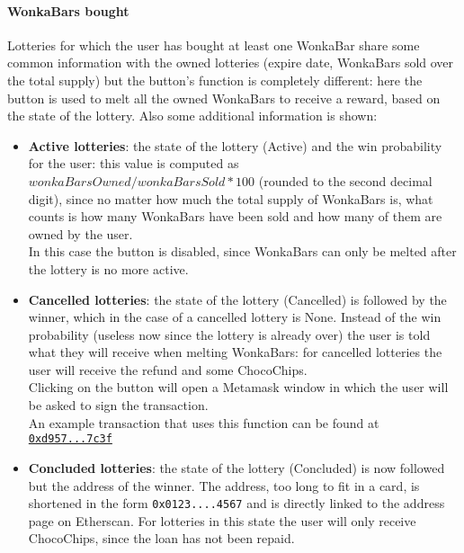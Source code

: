 \paragraph{WonkaBars bought} 
Lotteries for which the user has bought at least one WonkaBar share some common information with the owned lotteries (expire date, WonkaBars sold over the total supply) but the button's function is completely different: here the button is used to melt all the owned WonkaBars to receive a reward, based on the state of the lottery. Also some additional information is shown:
\begin{itemize}
    \item \textbf{Active lotteries}: the state of the lottery (Active) and the win probability for the user: this value is computed as $wonkaBarsOwned / wonkaBarsSold * 100$ (rounded to the second decimal digit), since no matter how much the total supply of WonkaBars is, what counts is how many WonkaBars have been sold and how many of them are owned by the user.\\
    In this case the button is disabled, since WonkaBars can only be melted after the lottery is no more active.
    \item \textbf{Cancelled lotteries}: the state of the lottery (Cancelled) is followed by the winner, which in the case of a cancelled lottery is None. Instead of the win probability (useless now since the lottery is already over) the user is told what they will receive when melting WonkaBars: for cancelled lotteries the user will receive the refund and some ChocoChips.\\
    Clicking on the button will open a Metamask window in which the user will be asked to sign the transaction.\\
    An example transaction that uses this function can be found at \href{https://goerli.etherscan.io/tx/0xd957d276b5499f6ad40e62a47ad9fd74f255f0a6fc6e1240903fd8aaf1337c3f}{\texttt{0xd957...7c3f}}\\
    \item \textbf{Concluded lotteries}: the state of the lottery (Concluded) is now followed but the address of the winner. The address, too long to fit in a card, is shortened in the form \texttt{0x0123....4567} and is directly linked to the address page on Etherscan\cite{GerliEtherscan}. For lotteries in this state the user will only receive ChocoChips, since the loan has not been repaid.
\end{itemize}

